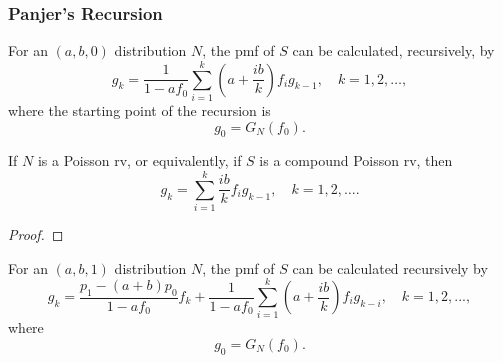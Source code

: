 \documentclass[notoc,notitlepage]{tufte-book}
\begin{document}
\subsubsection{Panjer's Recursion}%
\label{ssub:panjer_s_recursion}

\begin{thm}\label{thm:panjer_s_recursion_for_a_b_0_class}
  For an $(a, b, 0)$ distribution $N$, the pmf of $S$ can be calculated, recursively, by
  \begin{equation*}
    g_k = \frac{1}{1 - af_0} \sum_{i=1}^{k} \left( a + \frac{ib}{k} \right) f_i g_{k - 1}, \quad k = 1, 2, \ldots,
  \end{equation*}
  where the starting point of the recursion is
  \begin{equation*}
    g_0 = G_N(f_0).
  \end{equation*}
\end{thm}

\begin{eg}
  If $N$ is a Poisson rv, or equivalently, if $S$ is a compound Poisson rv, then
  \begin{equation*}
    g_k = \sum_{i=1}^{k} \frac{ib}{k} f_i g_{k - 1}, \quad k = 1, 2, \ldots.
  \end{equation*}
\end{eg}

\begin{proof}
  
\end{proof}

\begin{thm}\label{thm:panjer_s_recursion_for_a_b_1_class}
  For an $(a, b, 1)$ distribution $N$, the pmf of $S$ can be calculated recursively by
  \begin{equation*}
    g_k = \frac{p_1 - (a + b)p_0}{1 - af_0} f_k + \frac{1}{1 - af_0} \sum_{i=1}^{k} \left( a + \frac{ib}{k} \right) f_i g_{k - i}, \quad k = 1, 2, ...,
  \end{equation*}
  where
  \begin{equation*}
    g_0 = G_N(f_0).
  \end{equation*}
\end{thm}


\end{document}
